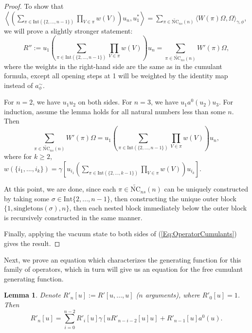 \documentclass[12pt]{amsart}
\newtheorem{Lemma}[Thm]{Lemma}
\theoremstyle{definition}
\newcommand{\ip}[2]{\left \langle{#1},{#2} \right \rangle}
\begin{document}
\begin{proof}
	To show that $\ip{\left( \sum_{\pi \in \mathrm{Int}(\{2,...,n-1\})} \prod_{V\in\pi} w(V) \right) u_n }{u_1^\ast} = \sum_{\pi\in\widetilde{\mathrm{NC}}_{ns}(n)} \langle W(\pi)\Omega , \Omega \rangle_{\gamma,\phi}$, we will prove a slightly stronger statement:
	\begin{equation}
	\label{Eq:OperatorCumulants}
	R'' :=	u_1 \left( \sum_{\pi \in \mathrm{Int}(\{2,...,n-1\})} \prod_{V\in\pi} w(V) \right) u_n = \sum_{\pi\in\widetilde{\mathrm{NC}}_{ns}(n)} W'(\pi)\Omega ,
	\end{equation}
	where the weights in the right-hand side are the same as in the cumulant formula, except all opening steps at 1 will be weighted by the identity map instead of $a_\phi^\sim$.
	
	For $n=2$, we have $u_1u_2$ on both sides. For $n=3$, we have $u_1a^0(u_2)u_3$. For induction, assume the lemma holds for all natural numbers less than some $n$. Then
	\begin{equation*}
	\sum_{\pi\in\widetilde{\mathrm{NC}}_{ns}(n)} W'(\pi)\Omega = u_1 \left( \sum_{\pi \in \mathrm{Int}(\{2,...,n-1\})} \prod_{V\in\pi} w(V) \right) u_n ,
	\end{equation*}
	where for $k\geq 2$, $w(\{i_1,...,i_k\}) = \gamma\left[u_{i_1} \left( \sum_{\pi \in \mathrm{Int}(\{2,...,k-1\})} \prod_{V\in\pi} w(V) \right) u_{i_k}\right] $.
	
	At this point, we are done, since each $\pi\in \widetilde{\mathrm{NC}}_{ns}(n)$ can be uniquely constructed by taking some $\sigma\in \mathrm{Int}\{2, ..., n-1\}$, then constructing the unique outer block $\{1, \text{singletons}(\sigma),n\}$, then each nested block immediately below the outer block is recursively constructed in the same manner.
	
	Finally, applying the vacuum state to both sides of (\ref{Eq:OperatorCumulants}) gives the result.
\end{proof}

Next, we prove an equation which characterizes the generating function for this family of operators, which in turn will give us an equation for the free cumulant generating function.

\begin{Lemma}
\label{Lemma:R'-recursion}
Denote $R'_n[u] := R'[u,..., u]$ ($n$ arguments), where $R'_0 [u] = 1$. Then
\begin{equation}
\label{Eq:R'-recursion}
R'_n[u] = \sum_{i=0}^{n-2} R'_i[u]\gamma [u R'_{n-i-2}[u]u] + R'_{n-1}[u]a^0(u).
\end{equation}
\end{Lemma}
\end{document}
